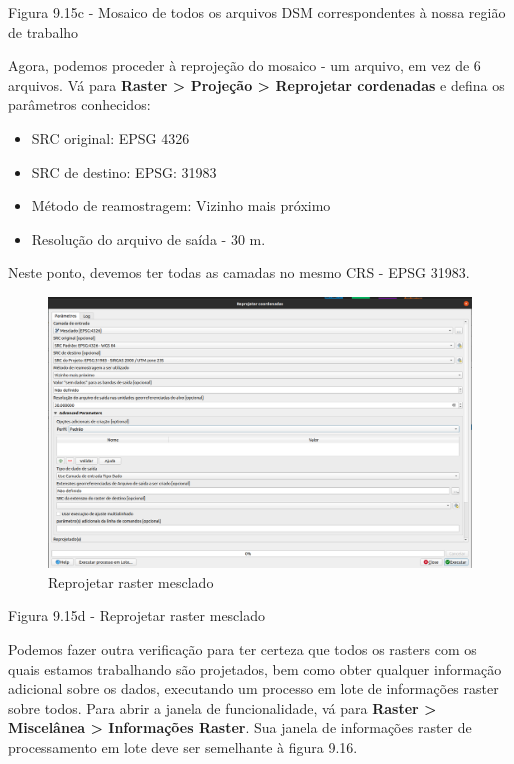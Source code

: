 \documentclass[
  portuguese,
]{krantz}
\providecommand{\tightlist}{%
  \setlength{\itemsep}{0pt}\setlength{\parskip}{0pt}}
\begin{document}
Figura 9.15c - Mosaico de todos os arquivos DSM correspondentes à nossa região de trabalho

Agora, podemos proceder à reprojeção do mosaico - um arquivo, em vez de 6 arquivos. Vá para \textbf{Raster \textgreater{} Projeção \textgreater{} Reprojetar cordenadas} e defina os parâmetros conhecidos:

\begin{itemize}
\tightlist
\item
  SRC original: EPSG 4326
\item
  SRC de destino: EPSG: 31983
\item
  Método de reamostragem: Vizinho mais próximo
\item
  Resolução do arquivo de saída - 30 m.
\end{itemize}

Neste ponto, devemos ter todas as camadas no mesmo CRS - EPSG 31983.

\begin{figure}
\centering
\includegraphics{media/modulo9/fig915_d.png}
\caption{Reprojetar raster mesclado}
\end{figure}

Figura 9.15d - Reprojetar raster mesclado

Podemos fazer outra verificação para ter certeza que todos os rasters com os quais estamos trabalhando são projetados, bem como obter qualquer informação adicional sobre os dados, executando um processo em lote de informações raster sobre todos. Para abrir a janela de funcionalidade, vá para \textbf{Raster \textgreater{} Miscelânea \textgreater{} Informações Raster}. Sua janela de informações raster de processamento em lote deve ser semelhante à figura 9.16.
\end{document}
